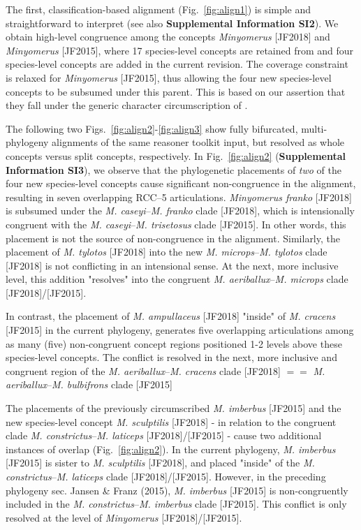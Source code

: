 \documentclass[fleqn,10pt,lineno]{wlpeerj} %
\begin{document}
	The first, classification-based alignment (Fig.~\ref{fig:align1}) is simple and straightforward to interpret (see also \textbf{Supplemental Information SI2}). 
	We obtain high-level congruence among the concepts \textit{Minyomerus} [JF2018] and \textit{Minyomerus} [JF2015], where 17 species-level concepts are retained from \citet{jansen2015} and four species-level concepts are added in the current revision.
	The coverage constraint is relaxed for \textit{Minyomerus} [JF2015], thus allowing the four new species-level concepts to be subsumed under this parent.
	This is based on our assertion that they fall under the generic character circumscription of \citet{jansen2015}.
	
	The following two Figs.~\ref{fig:align2}-\ref{fig:align3} show fully bifurcated, multi-phylogeny alignments of the same reasoner toolkit input, but resolved as whole concepts versus split concepts, respectively.
	In Fig.~\ref{fig:align2} (\textbf{Supplemental Information SI3}), we observe that the phylogenetic placements of \emph{two} of the four new species-level concepts cause significant non-congruence in the alignment, resulting in seven overlapping RCC--5 articulations.
	\textit{Minyomerus franko} [JF2018] is subsumed under the \textit{M. caseyi}--\textit{M. franko} clade [JF2018], which is intensionally congruent with the \textit{M. caseyi}--\textit{M. trisetosus} clade [JF2015].
	In other words, this placement is not the source of non-congruence in the alignment.
	Similarly, the placement of \textit{M. tylotos} [JF2018] into the new \textit{M. microps}--\textit{M. tylotos} clade [JF2018] is not conflicting in an intensional sense.
	At the next, more inclusive level, this addition "resolves" into the congruent \textit{M. aeriballux}--\textit{M. microps} clade [JF2018]/[JF2015].
	
	In contrast, the placement of \textit{M. ampullaceus} [JF2018] "inside" of \textit{M. cracens} [JF2015] in the current phylogeny, generates five overlapping articulations among as many (five) non-congruent concept regions positioned 1-2 levels above these species-level concepts.
	The conflict is resolved in the next, more inclusive and congruent region of the \textit{M. aeriballux}--\textit{M. cracens} clade [JF2018] $==$ \textit{M. aeriballux}--\textit{M. bulbifrons} clade [JF2015]
	
	The placements of the previously circumscribed \textit{M. imberbus} [JF2015] and the new species-level concept \textit{M. sculptilis} [JF2018] - in relation to the congruent clade \textit{M. constrictus}--\textit{M. laticeps} [JF2018]/[JF2015] - cause two additional instances of overlap (Fig.~\ref{fig:align2}).
	In the current phylogeny, \textit{M. imberbus} [JF2015] is sister to \textit{M. sculptilis} [JF2018], and placed "inside" of the \textit{M. constrictus}--\textit{M. laticeps} clade [JF2018]/[JF2015].
	However, in the preceding phylogeny sec. Jansen \& Franz (2015), \textit{M. imberbus} [JF2015] is non-congruently included in the \textit{M. constrictus}--\textit{M. imberbus} clade [JF2015].
	This conflict is only resolved at the level of \textit{Minyomerus} [JF2018]/[JF2015].
	
\end{document}
